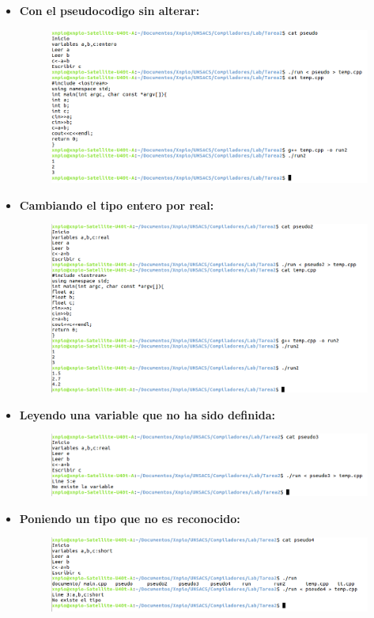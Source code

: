 \documentclass[a4paper,12pt]{article}
\begin{document}
\begin{itemize}
 \item \textbf{Con el pseudocodigo sin alterar:}


\begin{figure}[H]
 \centering
 \includegraphics[scale = 0.5]{1.png}
\end{figure}

 \item \textbf{Cambiando el tipo entero por real:}
 
\begin{figure}[H]
 \centering
 \includegraphics[scale = 0.5]{2.png}
\end{figure}

 \item \textbf{Leyendo una variable que no ha sido definida:}
 
\begin{figure}[H]
 \centering
 \includegraphics[scale = 0.5]{3.png}
\end{figure}

 \item \textbf{Poniendo un tipo que no es reconocido:}
 
\begin{figure}[H]
 \centering
 \includegraphics[scale = 0.5]{4.png}
\end{figure}


\end{itemize}
\end{document}
